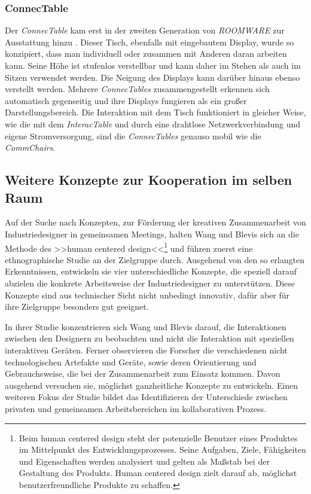 \subsubsection{ConnecTable}

Der \emph{ConnecTable} kam erst in der zweiten Generation von \emph{ROOMWARE} zur Ausstattung hinzu \citep{Streitz:2002p214}. Dieser Tisch, ebenfalls mit eingebautem Display, wurde so konzipiert, dass man individuell oder zusammen mit Anderen daran arbeiten kann. Seine Höhe ist stufenlos verstellbar und kann daher im Stehen als auch im Sitzen verwendet werden. Die Neigung des Displays kann darüber hinaus ebenso verstellt werden. Mehrere \emph{ConnecTables} zusammengestellt erkennen sich automatisch gegenseitig und ihre Displays fungieren als ein großer Darstellungsbereich. Die Interaktion mit dem Tisch funktioniert in gleicher Weise, wie die mit dem \emph{InteracTable} und durch eine drahtlose Netzwerkverbindung und eigene Stromversorgung, sind die \emph{ConnecTables} genauso mobil wie die \emph{CommChairs}.

\subsection{Weitere Konzepte zur Kooperation im selben Raum}

Auf der Suche nach Konzepten, zur Förderung der kreativen Zusammenarbeit von Industriedesigner in gemeinsamen Meetings, halten Wang und Blevis \citep{Wang:2004p110} sich an die Methode des >>human centered design<<\footnote{Beim human centered design steht der potenzielle Benutzer eines Produktes im Mittelpunkt des Entwicklungsprozesses. Seine Aufgaben, Ziele, Fähigkeiten und Eigenschaften werden analysiert und gelten als Maßstab bei der Gestaltung des Produkts. Human centered design zielt darauf ab, möglichst benutzerfreundliche Produkte zu schaffen.} und führen zuerst eine ethnographische Studie an der Zielgruppe durch. Ausgehend von den so erlangten Erkenntnissen, entwickeln sie vier unterschiedliche Konzepte, die speziell darauf abzielen die konkrete Arbeitsweise der Industriedesigner zu unterstützen. Diese Konzepte sind aus technischer Sicht nicht unbedingt innovativ, dafür aber für ihre Zielgruppe besonders gut geeignet.

In ihrer Studie konzentrieren sich Wang und Blevis \citep{Wang:2004p110} darauf, die Interaktionen zwischen den Designern zu beobachten und nicht die Interaktion mit speziellen interaktiven Geräten. Ferner observieren die Forscher die verschiedenen nicht technologischen Artefakte und Geräte, sowie deren Orientierung und Gebrauchsweise, die bei der Zusammenarbeit zum Einsatz kommen. Davon ausgehend versuchen sie, möglichst ganzheitliche Konzepte zu entwickeln. Einen weiteren Fokus der Studie bildet das Identifizieren der Unterschiede zwischen privaten und gemeinsamen Arbeitsbereichen im kollaborativen Prozess.

